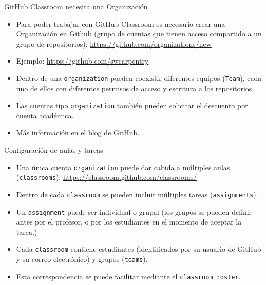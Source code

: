 \documentclass[xcolor={usenames,svgnames,dvipsnames}]{beamer}
\begin{document}
\begin{frame}[label={sec:orgb35e4e6},fragile]{GitHub Classroom necesita una Organización}
 \begin{itemize}
\item Para poder trabajar con GitHub Classroom es necesario crear una Organización en Github (grupo de cuentas que tienen acceso compartido a un grupo de repositorios): \url{https://github.com/organizations/new}

\item Ejemplo: \url{https://github.com/swcarpentry}

\item Dentro de una \texttt{organization} pueden coexistir diferentes equipos (\texttt{Team}), cada uno de ellos con diferentes permisos de acceso y escritura a los repositorios.

\item Las cuentas tipo \texttt{organization} también pueden solicitar el \href{https://help.github.com/en/articles/applying-for-an-educator-or-researcher-discount\#upgrading-your-organization}{descuento por cuenta académica}.

\item Más información en el \href{https://github.blog/2010-06-29-introducing-organizations/}{blog de GitHub}.
\end{itemize}
\end{frame}

\begin{frame}[label={sec:org5715ce8},fragile]{Configuración de aulas y tareas}
 \begin{itemize}
\item Una única cuenta \texttt{organization} puede dar cabida a múltiples aulas (\texttt{classrooms}): \url{https://classroom.github.com/classrooms/}
\item Dentro de cada \texttt{classroom} se pueden incluir múltiples tareas (\texttt{assignments}).
\item Un \texttt{assignment} puede ser individual o grupal (los grupos se pueden definir antes por el profesor, o por los estudiantes en el momento de aceptar la tarea.)
\item Cada \texttt{classroom} contiene estudiantes (identificados por su usuario de GitHub y su correo electrónico) y grupos (\texttt{teams}).
\item Esta correspondencia se puede facilitar mediante el \texttt{classroom roster}.
\end{itemize}
\end{frame}
\end{document}
